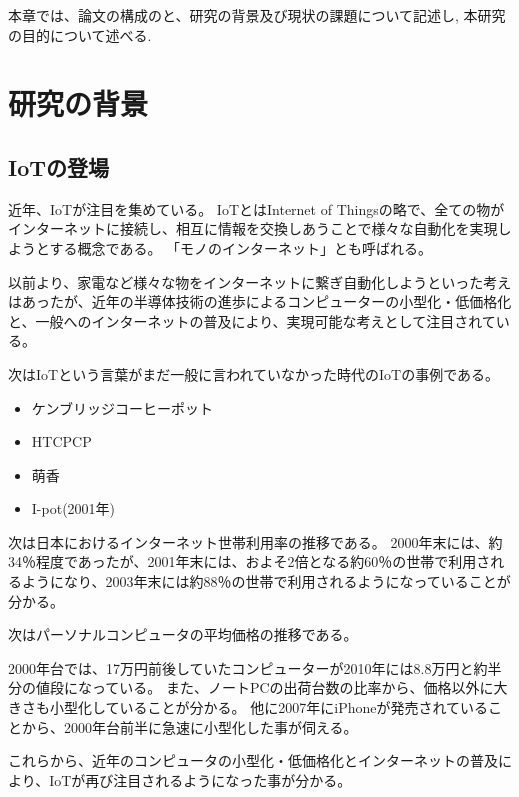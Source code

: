 本章では、論文の構成のと、研究の背景及び現状の課題について記述し, 本研究の目的について述べる.
\section{研究の背景}
\subsection{IoTの登場}
近年、IoTが注目を集めている。
IoTとはInternet of Thingsの略で、全ての物がインターネットに接続し、相互に情報を交換しあうことで様々な自動化を実現しようとする概念である。
「モノのインターネット」とも呼ばれる。

以前より、家電など様々な物をインターネットに繋ぎ自動化しようといった考えはあったが、近年の半導体技術の進歩によるコンピューターの小型化・低価格化と、一般へのインターネットの普及により、実現可能な考えとして注目されている。

次はIoTという言葉がまだ一般に言われていなかった時代のIoTの事例である。
\begin{itemize}
\item ケンブリッジコーヒーポット
\item HTCPCP
\item 萌香
\item I-pot(2001年)
\end{itemize}

次は日本におけるインターネット世帯利用率の推移である。
2000年末には、約34％程度であったが、2001年末には、およそ2倍となる約60％の世帯で利用されるようになり、2003年末には約88％の世帯で利用されるようになっていることが分かる。

次はパーソナルコンピュータの平均価格の推移である。

2000年台では、17万円前後していたコンピューターが2010年には8.8万円と約半分の値段になっている。
また、ノートPCの出荷台数の比率から、価格以外に大きさも小型化していることが分かる。
他に2007年にiPhoneが発売されていることから、2000年台前半に急速に小型化した事が伺える。

これらから、近年のコンピュータの小型化・低価格化とインターネットの普及により、IoTが再び注目されるようになった事が分かる。


